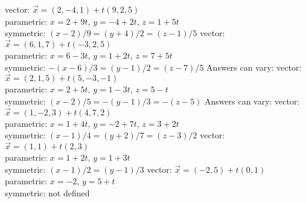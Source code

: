 \begin{Answer}
\Question vector: $\vec x = (2,-4,1) + t(9,2,5)$\\
parametric: $x= 2+9t$, $y=-4+2t$, $z = 1+5t$\\
symmetric: $(x-2)/9 =(y+4)/2 = (z-1)/5$
\Question vector: $\vec x = (6,1,7) + t(-3,2,5)$\\
parametric: $x= 6-3t$, $y=1+2t$, $z = 7+5t$\\
symmetric: $-(x-6)/3 =(y-1)/2 = (z-7)/5$
\Question Answers can vary:
vector: $\vec x = (2,1,5) + t(5,-3,-1)$\\
parametric: $x= 2+5t$, $y=1-3t$, $z = 5-t$\\
symmetric: $(x-2)/5 =-(y-1)/3 = -(z-5)$
\Question Answers can vary:
vector: $\vec x = (1,-2,3) + t(4,7,2)$\\
parametric: $x= 1+4t$, $y=-2+7t$, $z = 3+2t$\\
symmetric: $(x-1)/4 =(y+2)/7 = (z-3)/2$
\Question vector: $\vec x = (1,1) + t(2,3)$\\
parametric: $x= 1+2t$, $y=1+3t$\\
symmetric: $(x-1)/2=(y-1)/3$
\Question vector: $\vec x = (-2,5) + t(0,1)$\\
parametric: $x= -2$, $y=5+t$\\
symmetric: not defined

\end{Answer}
